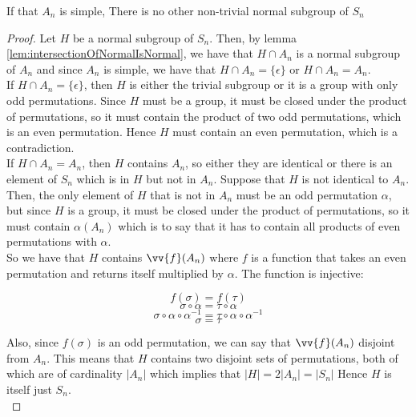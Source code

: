 \begin{theorem}
    If that $A_n$ is simple, There is no other non-trivial normal subgroup of $S_n$
\end{theorem}
\begin{proof}
    Let $H$ be a normal subgroup of $S_n$. Then, by lemma \ref{lem:intersectionOfNormalIsNormal}, we 
    have that $H \cap A_n$ is a normal subgroup of $A_n$ and since $A_n$ is simple, we have that 
    $H \cap A_n = \{\epsilon\}$ or $H \cap A_n = A_n$. \\

    If $H \cap A_n = \{\epsilon\}$, then $H$ is either the trivial subgroup or it is a group 
    with only odd permutations. Since $H$ must be a group, it must be closed under the 
    product of permutations, so it must contain the product of two odd permutations, which is an
    even permutation. Hence $H$ must contain an even permutation, which is a contradiction. \\

    If $H \cap A_n = A_n$, then $H$ contains $A_n$, so either they are identical or there 
    is an element of $S_n$ which is in $H$ but not in $A_n$. Suppose that $H$ is not
    identical to $A_n$. Then, the only element of $H$ that is not in $A_n$ must be an odd 
    permutation $\alpha$, but since $H$ is a group, it must be closed under the product of
    permutations, so it must contain $\alpha(A_n)$ which is to say that it has to contain 
    all products of even permutations with $\alpha$. \\  

    So we have that $H$ contains $\vv{f}(A_n)$ where $f$ is a function that takes an even
    permutation and returns itself multiplied by $\alpha$. The function is injective:

    $$ f(\sigma) = f(\tau) $$
    $$ \sigma \circ \alpha = \tau \circ \alpha  $$
    $$ \sigma \circ \alpha \circ \alpha^{-1} = \tau \circ \alpha \circ \alpha^{-1} $$
    $$ \sigma = \tau $$
    
    Also, since $f(\sigma)$ is an odd permutation, we can say that $\vv{f}(A_n)$ disjoint 
    from $A_n$. This means that $H$ contains two disjoint sets of permutations, both of which are
    of cardinality $|A_n|$ which implies that $|H| = 2|A_n| = |S_n|$ Hence $H$ is itself just $S_n$. \\

\end{proof} 
\vspace{0.4em}

